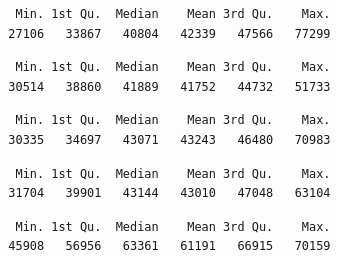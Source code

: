 \documentclass[
  us-letterpaper,
]{scrreprt}
\newenvironment{Shaded}{\begin{snugshade}}{\end{snugshade}}
\newcommand{\FunctionTok}[1]{\textcolor[rgb]{0.28,0.35,0.67}{#1}}
\newcommand{\NormalTok}[1]{\textcolor[rgb]{0.00,0.23,0.31}{#1}}
\newcommand{\SpecialCharTok}[1]{\textcolor[rgb]{0.37,0.37,0.37}{#1}}
\theoremstyle{plain}
\theoremstyle{plain}
\theoremstyle{definition}
\theoremstyle{remark}
\begin{document}
\begin{verbatim}
   Min. 1st Qu.  Median    Mean 3rd Qu.    Max. 
  27106   33867   40804   42339   47566   77299 
\end{verbatim}

\begin{Shaded}
\end{Shaded}

\begin{verbatim}
   Min. 1st Qu.  Median    Mean 3rd Qu.    Max. 
  30514   38860   41889   41752   44732   51733 
\end{verbatim}

\begin{Shaded}
\end{Shaded}

\begin{verbatim}
   Min. 1st Qu.  Median    Mean 3rd Qu.    Max. 
  30335   34697   43071   43243   46480   70983 
\end{verbatim}

\begin{Shaded}
\end{Shaded}

\begin{verbatim}
   Min. 1st Qu.  Median    Mean 3rd Qu.    Max. 
  31704   39901   43144   43010   47048   63104 
\end{verbatim}

\begin{Shaded}
\end{Shaded}

\begin{verbatim}
   Min. 1st Qu.  Median    Mean 3rd Qu.    Max. 
  45908   56956   63361   61191   66915   70159 
\end{verbatim}
\end{document}
